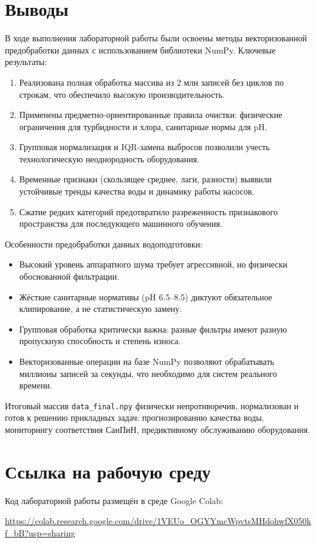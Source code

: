 \documentclass[oneside,a4paper,14pt]{extarticle}
\begin{document}
\section*{Выводы}
\indent
В ходе выполнения лабораторной работы были освоены методы векторизованной предобработки данных с использованием библиотеки NumPy. Ключевые результаты:
\begin{enumerate}
	\item Реализована полная обработка массива из 2 млн записей без циклов по строкам, что обеспечило высокую производительность.
	\item Применены предметно-ориентированные правила очистки: физические ограничения для турбидности и хлора, санитарные нормы для pH.
	\item Групповая нормализация и IQR-замена выбросов позволили учесть технологическую неоднородность оборудования.
	\item Временные признаки (скользящее среднее, лаги, разности) выявили устойчивые тренды качества воды и динамику работы насосов.
	\item Сжатие редких категорий предотвратило разреженность признакового пространства для последующего машинного обучения.
\end{enumerate}

\indent
Особенности предобработки данных водоподготовки:
\begin{itemize}
	\item Высокий уровень аппаратного шума требует агрессивной, но физически обоснованной фильтрации.
	\item Жёсткие санитарные нормативы (pH 6.5--8.5) диктуют обязательное клипирование, а не статистическую замену.
	\item Групповая обработка критически важна: разные фильтры имеют разную пропускную способность и степень износа.
	\item Векторизованные операции на базе NumPy позволяют обрабатывать миллионы записей за секунды, что необходимо для систем реального времени.
\end{itemize}

\indent
Итоговый массив \texttt{data\_final.npy} физически непротиворечив, нормализован и готов к решению прикладных задач: прогнозированию качества воды, мониторингу соответствия СанПиН, предиктивному обслуживанию оборудования.

\section*{Ссылка на рабочую среду}
Код лабораторной работы размещён в среде Google Colab:
\begin{center}
\url{https://colab.research.google.com/drive/1VEUo_OGYYmcWpvtsMHdohwfX050kf_bB?usp=sharing}
\end{center}
\end{document}

